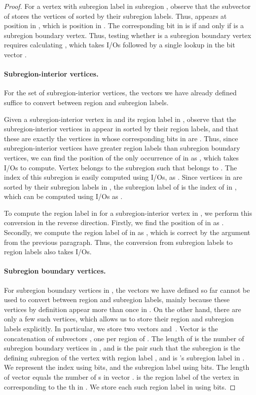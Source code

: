 \begin{proof}
  For a vertex  with subregion label  in subregion
  , observe that the subvector  of 
  stores the vertices of  sorted by their subregion labels.
  Thus,  appears at position  in ,
  which is position  in .
  The corresponding bit  in  is  if and only if
   is a subregion boundary vertex.
  Thus, testing whether  is a subregion boundary vertex requires calculating
  , which takes  I/Os followed by a single lookup
  in the bit vector .

\paragraph{Subregion-interior vertices.}


  For the set of subregion-interior vertices, the vectors we have already
  defined suffice to convert between region
  and subregion labels.

  Given a subregion-interior vertex  in  and its region label
   in , observe that the subregion-interior vertices in
   appear in  sorted by their region labels, and
  that these are exactly the vertices in  whose corresponding
  bits in  are .
  Thus, since subregion-interior vertices have greater region labels than
  subregion boundary vertices, we can find the position  of the only
  occurrence of  in  as
  , which takes  I/Os to compute.
  Vertex  belongs to the subregion  such that
   belongs to .
  The index  of this subregion is easily computed using  I/Os, as
  .
  Since vertices in  are sorted by their subregion labels in
  , the subregion label of  is the index of 
  in , which can be computed using  I/Os as
  .

  To compute the region label in  for a subregion-interior
  vertex  in , we perform this conversion in the reverse
  direction.
  Firstly, we find the position  of  in  as
  .
  Secondly, we compute the region label of  in  as
  ,
  which is correct by the argument from the previous paragraph.
  Thus, the conversion from subregion labels to region labels also takes
   I/Os.

\paragraph{Subregion boundary vertices.}


  For subregion boundary vertices in , the vectors we have defined so
  far cannot be used to convert between region and subregion labels, mainly
  because these vertices by definition appear more than once in .
  On the other hand, there are only a few such vertices, which allows us to
  store their region and subregion labels explicitly.
  In particular, we store two vectors  and~.
  Vector  is the concatenation of subvectors , one per region  of .
  The length of  is the number of subregion boundary vertices
  in , and  is the pair  such that the
  subregion  is the defining subregion of the vertex 
  with region label , and  is 's subregion label in .
  We represent the index  using  bits, and the subregion
  label  using  bits.
  The length of vector  equals the number of s in vector
  .
   is the region label of the vertex in  corresponding
  to the th  in .
  We store each such region label in  using  bits.


\end{proof}
